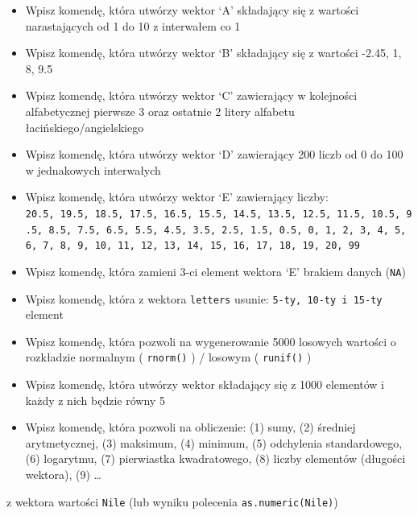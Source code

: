 \documentclass[]{book}
\providecommand{\tightlist}{%
  \setlength{\itemsep}{0pt}\setlength{\parskip}{0pt}}
\theoremstyle{definition}
\theoremstyle{definition}
\theoremstyle{definition}
\theoremstyle{remark}
\begin{document}
\begin{itemize}
\tightlist
\item
  Wpisz komendę, która utwórzy wektor `A' składający się z wartości
  narastających od 1 do 10 z interwałem co 1
\item
  Wpisz komendę, która utwórzy wektor `B' składający się z wartości
  -2.45, 1, 8, 9.5
\item
  Wpisz komendę, która utwórzy wektor `C' zawierający w kolejności
  alfabetycznej pierwsze 3 oraz ostatnie 2 litery alfabetu
  łacińskiego/angielskiego
\item
  Wpisz komendę, która utwórzy wektor `D' zawierający 200 liczb od 0 do
  100 w jednakowych interwałych
\item
  Wpisz komendę, która utwórzy wektor `E' zawierający liczby:
  \texttt{20.5,\ 19.5,\ 18.5,\ 17.5,\ 16.5,\ 15.5,\ 14.5,\ 13.5,\ 12.5,\ 11.5,\ 10.5,\ 9.5,\ 8.5,\ 7.5,\ 6.5,\ 5.5,\ 4.5,\ 3.5,\ 2.5,\ 1.5,\ 0.5,\ 0,\ 1,\ 2,\ 3,\ 4,\ 5,\ 6,\ 7,\ 8,\ 9,\ 10,\ 11,\ 12,\ 13,\ 14,\ 15,\ 16,\ 17,\ 18,\ 19,\ 20,\ 99}
\item
  Wpisz komendę, która zamieni 3-ci element wektora `E' brakiem danych
  (\texttt{NA})
\item
  Wpisz komendę, która z wektora \texttt{letters} usunie:
  \texttt{5-ty,\ 10-ty\ i\ 15-ty} element
\item
  Wpisz komendę, która pozwoli na wygenerowanie 5000 losowych wartości o
  rozkładzie normalnym ( \texttt{rnorm()} ) / losowym ( \texttt{runif()}
  )
\item
  Wpisz komendę, która utwórzy wektor składający się z 1000 elementów i
  każdy z nich będzie równy 5
\item
  Wpisz komendę, która pozwoli na obliczenie: (1) sumy, (2) średniej
  arytmetycznej, (3) maksimum, (4) minimum, (5) odchylenia
  standardowego, (6) logarytmu, (7) pierwiastka kwadratowego, (8) liczby
  elementów (długości wektora), (9) \ldots{}
\end{itemize}

z wektora wartości \texttt{Nile} (lub wyniku polecenia
\texttt{as.numeric(Nile)})
\end{document}

